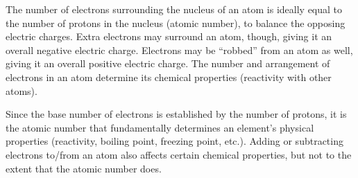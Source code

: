 The number of electrons surrounding the nucleus of an atom is ideally equal to the number of protons in the nucleus (atomic number), to balance the opposing electric charges.  Extra electrons may surround an atom, though, giving it an overall negative electric charge.  Electrons may be ``robbed'' from an atom as well, giving it an overall positive electric charge.  The number and arrangement of electrons in an atom determine its chemical properties (reactivity with other atoms).

Since the base number of electrons is established by the number of protons, it is the atomic number that fundamentally determines an element's physical properties (reactivity, boiling point, freezing point, etc.).  Adding or subtracting electrons to/from an atom also affects certain chemical properties, but not to the extent that the atomic number does.











